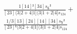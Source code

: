\documentclass[varwidth, border=5pt]{standalone}
\begin{document}
\begin{my}
$\begin{gathered}
\scriptscriptstyle\frac{1[14]²[34]s_{𝟓}²}{[23]⟨3|2+4|1]⟨3|1+2|4]s_{124}} +\\
\scriptscriptstyle\frac{1/3[13][24][14][34]s_{𝟓}²}{[23]²⟨3|2+4|1]⟨3|1+2|4]s_{124}} \phantom{+}
\end{gathered}$
\end{my}
\end{document}
